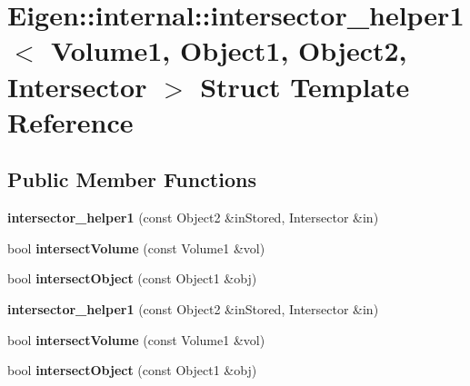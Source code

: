 \hypertarget{struct_eigen_1_1internal_1_1intersector__helper1}{}\section{Eigen\+:\+:internal\+:\+:intersector\+\_\+helper1$<$ Volume1, Object1, Object2, Intersector $>$ Struct Template Reference}
\label{struct_eigen_1_1internal_1_1intersector__helper1}
\subsection*{Public Member Functions}
\begin{DoxyCompactItemize}
\item 
\mbox{\label{struct_eigen_1_1internal_1_1intersector__helper1_a6d5c7ff15e3c6707cf1984c65f09a1aa}} 
{\bfseries intersector\+\_\+helper1} (const Object2 \&in\+Stored, Intersector \&in)
\item 
\mbox{\label{struct_eigen_1_1internal_1_1intersector__helper1_a37d3ee04a86dbbedc45e532eedeb7139}} 
bool {\bfseries intersect\+Volume} (const Volume1 \&vol)
\item 
\mbox{\label{struct_eigen_1_1internal_1_1intersector__helper1_a23377af4cd65b64c25b0d17977e9a6d1}} 
bool {\bfseries intersect\+Object} (const Object1 \&obj)
\item 
\mbox{\label{struct_eigen_1_1internal_1_1intersector__helper1_a6d5c7ff15e3c6707cf1984c65f09a1aa}} 
{\bfseries intersector\+\_\+helper1} (const Object2 \&in\+Stored, Intersector \&in)
\item 
\mbox{\label{struct_eigen_1_1internal_1_1intersector__helper1_a37d3ee04a86dbbedc45e532eedeb7139}} 
bool {\bfseries intersect\+Volume} (const Volume1 \&vol)
\item 
\mbox{\label{struct_eigen_1_1internal_1_1intersector__helper1_a23377af4cd65b64c25b0d17977e9a6d1}} 
bool {\bfseries intersect\+Object} (const Object1 \&obj)
\end{DoxyCompactItemize}
